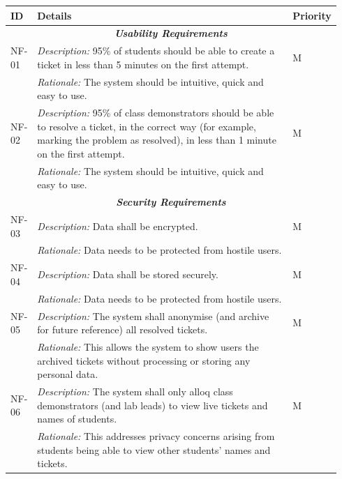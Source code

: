 \begin{table}[H]
\small
\begin{tabular}{|p{0.07\linewidth} | p{0.78\linewidth} |p{0.09\linewidth}|}
 \hline
 \textbf{ID} & \textbf{Details} & \textbf{Priority} \\
 
 \hline
   \multicolumn{3}{c}{\textit{\textbf{Usability Requirements}}}\\
 \hline
 
   NF-01 & \textit{Description:} 95\% of students should be able to create a ticket in less than 5 minutes on the first attempt. & M \\
  \cline{2-2}
  & \textit{Rationale:} The system should be intuitive, quick and easy to use. & \\

   \hline\hline
      NF-02 & \textit{Description:} 95\% of class demonstrators should be able to resolve a ticket, in the correct way (for example, marking the problem as resolved), in less than 1 minute on the first attempt. & M \\
  \cline{2-2}
  & \textit{Rationale:} The system should be intuitive, quick and easy to use. & \\
   \hline
     
     \multicolumn{3}{c}{\textit{\textbf{Security Requirements}}}\\
     
     \hline
 NF-03 & \textit{Description:} Data shall be encrypted. & M\\
  \cline{2-2}
  & \textit{Rationale:} Data needs to be protected from hostile users. & \\
  
    \hline\hline
 NF-04 & \textit{Description:} Data shall be stored securely. & M\\
  \cline{2-2}
  & \textit{Rationale:} Data needs to be protected from hostile users. & \\
  
      \hline\hline
 NF-05 & \textit{Description:} The system shall anonymise (and archive for future reference) all resolved tickets. & M\\
  \cline{2-2}
  & \textit{Rationale:} This allows the system to show users the archived tickets without processing or storing any personal data. & \\
  
      \hline\hline
 NF-06 & \textit{Description:} The system shall only alloq class demonstrators (and lab leads) to view live tickets and names of students. & M\\
  \cline{2-2}
  & \textit{Rationale:} This addresses privacy concerns arising from students being able to view other students' names and tickets. & \\
\hline
  

\end{tabular}
\end{table}
